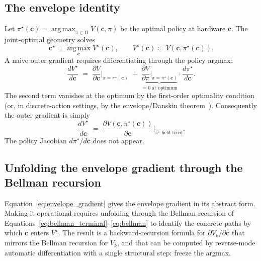\documentclass[11pt,a4paper,onecolumn]{article}
\newcommand{\argmax}{\operatorname*{arg\,max}}
\newcommand{\bc}{\bm{c}}
\begin{document}
\subsection{The envelope identity}
\label{sec:envelope_statement}

Let $\pi^\star(\bc) = \argmax_{\pi \in \Pi} V(\bc, \pi)$ be the optimal policy at hardware $\bc$.  The joint-optimal geometry solves
\begin{equation}
\bc^\star = \argmax_{\bc} V^\star(\bc), \qquad V^\star(\bc) \coloneqq V(\bc, \pi^\star(\bc)).
\end{equation}
A naive outer gradient requires differentiating through the policy argmax:
\begin{equation}
\frac{dV^\star}{d\bc} \;=\; \frac{\partial V}{\partial \bc}\bigg|_{\pi = \pi^\star(\bc)} \;+\; \underbrace{\frac{\partial V}{\partial \pi}\bigg|_{\pi = \pi^\star(\bc)}}_{= 0 \text{ at optimum}} \cdot \frac{d\pi^\star}{d\bc}.
\end{equation}
The second term vanishes at the optimum by the first-order optimality condition (or, in discrete-action settings, by the envelope/Danskin theorem~\cite{danskin1966theory, milgrom2002envelope, bonnans2000perturbation}).  Consequently the outer gradient is simply
\begin{equation}
\boxed{\;\frac{dV^\star}{d\bc} \;=\; \frac{\partial V(\bc, \pi^\star(\bc))}{\partial \bc}\bigg|_{\pi^\star \text{ held fixed}}.\;}
\label{eq:envelope_gradient}
\end{equation}
The policy Jacobian $d\pi^\star/d\bc$ does not appear.

\subsection{Unfolding the envelope gradient through the Bellman recursion}
\label{sec:envelope_unfolded}

Equation~\eqref{eq:envelope_gradient} gives the envelope gradient in its abstract form.  Making it operational requires unfolding through the Bellman recursion of Equations~\eqref{eq:bellman_terminal}--\eqref{eq:bellman} to identify the concrete paths by which $\bc$ enters $V^\star$.  The result is a backward-recursion formula for $\partial V_k / \partial \bc$ that mirrors the Bellman recursion for $V_k$, and that can be computed by reverse-mode automatic differentiation with a single structural step: freeze the argmax.
\end{document}
